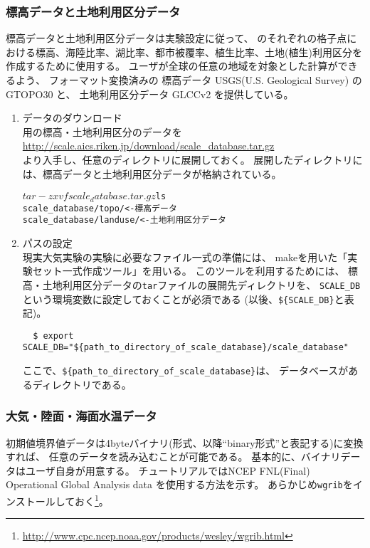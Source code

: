 \subsubsection{標高データと土地利用区分データ}
標高データと土地利用区分データは実験設定に従って、
\scalerm のそれぞれの格子点における標高、海陸比率、湖比率、都市被覆率、植生比率、土地(植生)利用区分を
作成するために使用する。
ユーザが全球の任意の地域を対象とした計算ができるよう、
フォーマット変換済みの
標高データ USGS(U.S. Geological Survey) のGTOPO30 と、
土地利用区分データ GLCCv2 を提供している。

\begin{enumerate}
\item データのダウンロード\\
\scalerm 用の標高・土地利用区分のデータを\\
 \url{http://scale.aics.riken.jp/download/scale_database.tar.gz}\\
より入手し、任意のディレクトリに展開しておく。
展開したディレクトリには、標高データと土地利用区分データが格納されている。
\begin{alltt}
  $ tar -zxvf scale_database.tar.gz
  $ ls 
    scale_database/topo/    <- 標高データ
    scale_database/landuse/ <- 土地利用区分データ
\end{alltt}

\item パスの設定\\
現実大気実験の実験に必要なファイル一式の準備には、
makeを用いた「実験セット一式作成ツール」を用いる。
このツールを利用するためには、
標高・土地利用区分データの\verb|tar|ファイルの展開先ディレクトリを、
\verb|SCALE_DB| という環境変数に設定しておくことが必須である (以後、\verb|${SCALE_DB}|と表記)。
\begin{verbatim}
  $ export SCALE_DB="${path_to_directory_of_scale_database}/scale_database"
\end{verbatim}
ここで、\verb|${path_to_directory_of_scale_database}|は、
データベースがあるディレクトリである。
\end{enumerate}



\subsubsection{大気・陸面・海面水温データ}
初期値境界値データは4byteバイナリ(\grads 形式、以降``binary形式''と表記する)に変換すれば、
任意のデータを読み込むことが可能である。
基本的に、バイナリデータはユーザ自身が用意する。
チュートリアルではNCEP FNL(Final) Operational Global Analysis data を使用する方法を示す。
あらかじめ\verb|wgrib|をインストールしておく\footnote{\url{http://www.cpc.ncep.noaa.gov/products/wesley/wgrib.html}}。

